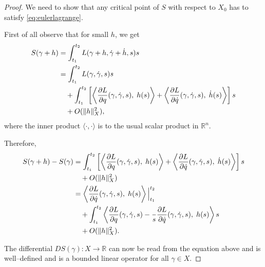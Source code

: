 \documentclass[english,fontsize=11pt,paper=a5,oneside]{scrbook}
\newcommand{\R}{\mathbb{R}}
\newcommand{\lag}{\langle}
\newcommand{\rag}{\rangle}
\let\d\relax
\newcommand{\d}{\mathrm{d}}
\theoremstyle{definition}
\begin{document}
\begin{proof}
  We need to show that any critical point of $S$ with respect to $X_0$ has to satisfy \eqref{eq:eulerlagrange}.

  First of all observe that for small $h$, we get
  \begin{equation}
    \begin{split}
      S(\gamma + h) &= \int_{t_1}^{t_2} L(\gamma + h, \dot \gamma + \dot h, s) \d s \\
      &= \int_{t_1}^{t_2} %
      L(\gamma, \dot \gamma, s) \d s \\
      &\quad + \int_{t_1}^{t_2} \left[
        \left\lag
        \frac{\partial L}{\partial q}(\gamma, \dot \gamma, s),\;
        h(s)
        \right\rag
        + \left\lag
        \frac{\partial L}{\partial \dot q}(\gamma, \dot \gamma, s),\;
        \dot h(s)
        \right\rag
        \right] \d s \\
      &\quad + O(\|h\|^2_X),
    \end{split}
  \end{equation}
  where the inner product $\lag\cdot,\cdot\rag$ is to the usual scalar product in $\R^n$.

  Therefore,
  \begin{equation}
    \begin{split}
      S(\gamma+h) - S(\gamma) &= \int_{t_1}^{t_2} \left[
        \left\lag\frac{\partial L}{\partial q}(\gamma, \dot \gamma, s),\; h(s)\right\rag
        + \left\lag\frac{\partial L}{\partial \dot q}(\gamma, \dot \gamma, s),\; \dot h(s)\right\rag
        \right] \d s\\
      &\quad + O(\|h\|^2_X)\\
      &= \left\lag\frac{\partial L}{\partial \dot q}(\gamma, \dot \gamma, s),\; h(s)\right\rag \Big|_{t_1}^{t_2} \\
      &\quad + \int_{t_1}^{t_2} \left\lag
      \frac{\partial L}{\partial q}(\gamma, \dot \gamma, s)
      - \frac{\d}{\d s}\frac{\partial L}{\partial \dot q}(\gamma, \dot \gamma, s)
      ,\; h(s)\right\rag \d s\\
      &\quad + O(\|h\|^2_X).
    \end{split}
  \end{equation}

  The differential $DS(\gamma): X \to \R$ can now be read from the equation above and is well--defined and is a bounded linear operator for all $\gamma\in X$.


\end{proof}
\end{document}
